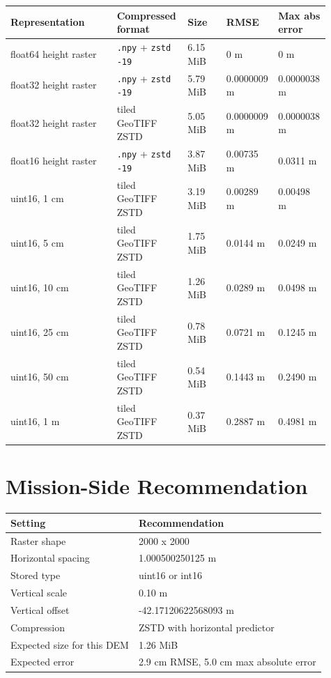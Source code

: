 \documentclass[10pt]{article}
\begin{document}
\begin{center}
\small
\begin{tabular}{p{0.33\linewidth}p{0.22\linewidth}p{0.12\linewidth}p{0.12\linewidth}p{0.12\linewidth}}
\toprule
Representation & Compressed format & Size & RMSE & Max abs error \\
\midrule
float64 height raster & \texttt{.npy} + \texttt{zstd -19} & 6.15 MiB & 0 m & 0 m \\
float32 height raster & \texttt{.npy} + \texttt{zstd -19} & 5.79 MiB & 0.0000009 m & 0.0000038 m \\
float32 height raster & tiled GeoTIFF ZSTD & 5.05 MiB & 0.0000009 m & 0.0000038 m \\
float16 height raster & \texttt{.npy} + \texttt{zstd -19} & 3.87 MiB & 0.00735 m & 0.0311 m \\
uint16, 1 cm & tiled GeoTIFF ZSTD & 3.19 MiB & 0.00289 m & 0.00498 m \\
uint16, 5 cm & tiled GeoTIFF ZSTD & 1.75 MiB & 0.0144 m & 0.0249 m \\
uint16, 10 cm & tiled GeoTIFF ZSTD & 1.26 MiB & 0.0289 m & 0.0498 m \\
uint16, 25 cm & tiled GeoTIFF ZSTD & 0.78 MiB & 0.0721 m & 0.1245 m \\
uint16, 50 cm & tiled GeoTIFF ZSTD & 0.54 MiB & 0.1443 m & 0.2490 m \\
uint16, 1 m & tiled GeoTIFF ZSTD & 0.37 MiB & 0.2887 m & 0.4981 m \\
\bottomrule
\end{tabular}
\end{center}

\section{Mission-Side Recommendation}

\begin{center}
\begin{tabular}{ll}
\toprule
Setting & Recommendation \\
\midrule
Raster shape & 2000 x 2000 \\
Horizontal spacing & 1.000500250125 m \\
Stored type & uint16 or int16 \\
Vertical scale & 0.10 m \\
Vertical offset & -42.17120622568093 m \\
Compression & ZSTD with horizontal predictor \\
Expected size for this DEM & 1.26 MiB \\
Expected error & 2.9 cm RMSE, 5.0 cm max absolute error \\
\bottomrule
\end{tabular}
\end{center}
\end{document}
